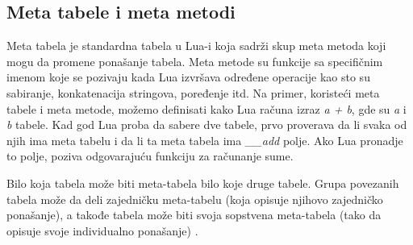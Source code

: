 \documentclass[a4paper]{article}
\begin{document}
\subsection*{Meta tabele i meta metodi}
Meta tabela je standardna tabela u Lua-i koja sadrži skup meta metoda koji mogu da promene ponašanje tabela. Meta metode su funkcije sa specifičnim imenom koje se pozivaju kada Lua izvršava određene operacije kao sto su sabiranje, konkatenacija stringova, poređenje itd. Na primer, koristeći meta tabele i meta metode, možemo definisati kako Lua računa izraz \textit{a + b}, gde su \textit{a} i \textit{b} tabele. Kad god Lua proba da sabere dve tabele, prvo proverava da li svaka od njih ima meta tabelu i da li ta meta tabela ima \textit{\_\_add} polje. Ako Lua pronadje to polje, poziva odgovarajuću funkciju za računanje sume.

Bilo koja tabela može biti meta-tabela bilo koje druge tabele. Grupa povezanih tabela može da deli zajedničku meta-tabelu (koja opisuje njihovo zajedničko ponašanje), a takođe tabela može biti svoja sopstvena meta-tabela (tako da opisuje svoje individualno ponašanje) \cite{bookProgInLua}.
\end{document}
